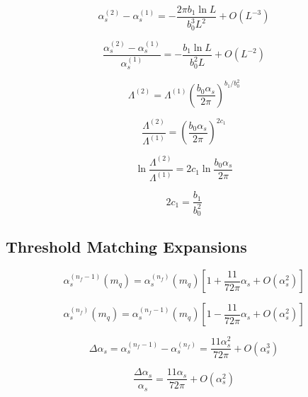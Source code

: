 \documentclass[11pt,a4paper]{article}
\theoremstyle{definition}
\begin{document}
\begin{equation}
\label{eq:add-19}
\alpha_s^{(2)} - \alpha_s^{(1)} = -\frac{2\pi b_1\ln L}{b_0^3 L^2} + O(L^{-3})
\end{equation}

\begin{equation}
\label{eq:add-20}
\frac{\alpha_s^{(2)} - \alpha_s^{(1)}}{\alpha_s^{(1)}} = -\frac{b_1\ln L}{b_0^2 L} + O(L^{-2})
\end{equation}

\begin{equation}
\label{eq:add-21}
\Lambda^{(2)} = \Lambda^{(1)}\left(\frac{b_0\alpha_s}{2\pi}\right)^{b_1/b_0^2}
\end{equation}

\begin{equation}
\label{eq:add-22}
\frac{\Lambda^{(2)}}{\Lambda^{(1)}} = \left(\frac{b_0\alpha_s}{2\pi}\right)^{2c_1}
\end{equation}

\begin{equation}
\label{eq:add-23}
\ln\frac{\Lambda^{(2)}}{\Lambda^{(1)}} = 2c_1\ln\frac{b_0\alpha_s}{2\pi}
\end{equation}

\begin{equation}
\label{eq:add-24}
2c_1 = \frac{b_1}{b_0^2}
\end{equation}

\subsection{Threshold Matching Expansions}
\label{subsec:add-threshold}

\begin{equation}
\label{eq:add-25}
\alpha_s^{(n_f-1)}(m_q) = \alpha_s^{(n_f)}(m_q)\left[1 + \frac{11}{72\pi}\alpha_s + O(\alpha_s^2)\right]
\end{equation}

\begin{equation}
\label{eq:add-26}
\alpha_s^{(n_f)}(m_q) = \alpha_s^{(n_f-1)}(m_q)\left[1 - \frac{11}{72\pi}\alpha_s + O(\alpha_s^2)\right]
\end{equation}

\begin{equation}
\label{eq:add-27}
\Delta\alpha_s = \alpha_s^{(n_f-1)} - \alpha_s^{(n_f)} = \frac{11\alpha_s^2}{72\pi} + O(\alpha_s^3)
\end{equation}

\begin{equation}
\label{eq:add-28}
\frac{\Delta\alpha_s}{\alpha_s} = \frac{11\alpha_s}{72\pi} + O(\alpha_s^2)
\end{equation}
\end{document}

